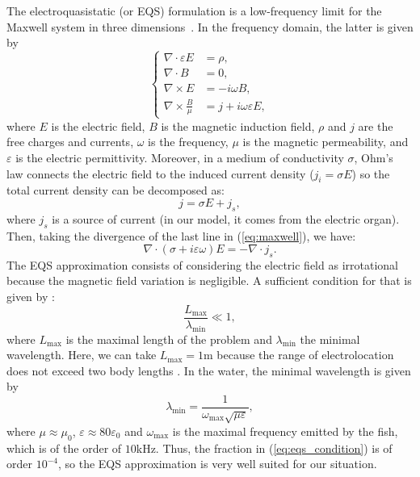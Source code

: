 The electroquasistatic (or EQS) formulation is a low-frequency
limit for the Maxwell system in three dimensions~\cite{vanRienen2001}. In the frequency
domain, the latter is given by
\begin{equation}
\left\{ \begin{alignedat}{1}\nabla\cdot\varepsilon {E} & =\rho,\\
\nabla\cdot {B} & =0,\\
\nabla\times {E} & =-i\omega {B},\\
\nabla\times\frac{ {B}}{\mu} & = {j}+i\omega\varepsilon {E},
\end{alignedat}
\right.\label{eq:maxwell}
\end{equation}
where $E$ is the electric field, $B$ is the magnetic induction
field, $\rho$ and $j$ are the free charges and currents, $\omega$
is the frequency, $\mu$ is the magnetic permeability, and
$\varepsilon$ is the electric permittivity. Moreover, in a medium
of conductivity $\sigma$, Ohm's law connects the electric field to
the induced current density (${j_{i}}=\sigma {E}$) so the total
current density can be decomposed as:
\[
{j}=\sigma {E}+ {j_{s}},
\]
 where ${j_{s}}$ is a source of current (in our model, it
comes from the electric organ). Then, taking the divergence of the
last line in (\ref{eq:maxwell}), we have:
\begin{equation}
\nabla\cdot(\sigma+i\varepsilon\omega) {E}=-\nabla\cdot
{j_{s}}.\label{eq:div-maxwell4}
\end{equation}
The EQS approximation consists of considering the electric field
as irrotational because the magnetic field variation is
negligible. A sufficient condition for that is given by
\cite{vanRienen2001}:
\begin{equation}
\frac{L_{\textrm{max}}}{\lambda_{\textrm{min}}}\ll1,\label{eq:eqs_condition}
\end{equation}
 where $L_{\textrm{max}}$ is the maximal length of the problem and $\lambda_{\textrm{min}}$
the minimal wavelength. Here, we can take $L_{\textrm{max}}=1$m because
the range of electrolocation does not exceed two body lengths
\cite{moller1995electric}. In the water, the minimal wavelength is given
by
\[
\lambda_{\textrm{min}}=\frac{1}{\omega_{\textrm{max}}\sqrt{\mu\varepsilon}},
\]
 where $\mu\approx\mu_{0}$, $\varepsilon\approx80\varepsilon_{0}$
and $\omega_{\textrm{max}}$ is the maximal frequency emitted by the
fish, which is of the order of $10$kHz. Thus, the fraction in
(\ref{eq:eqs_condition}) is of order $10^{-4}$, so the EQS
approximation is very well suited for our situation.


